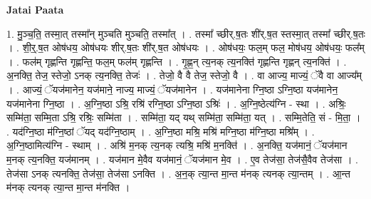 \documentclass[17pt]{extarticle}
\begin{document}
\textbf{Jatai Paata} \newline

1. मु॒ञ्च॒ति॒ तस्मा॒त् तस्मा᳚न् मुञ्चति मुञ्चति॒ तस्मा᳚त् । . तस्मा᳚ च्छीर्.ष॒तः शी॑र्.ष॒त स्तस्मा॒त् तस्मा᳚ च्छीर्.ष॒तः । . शी॒र्॒.ष॒त ओष॑धय॒ ओष॑धयः शीर्.ष॒तः शी॑र्.ष॒त ओष॑धयः । . ओष॑धयः॒ फल॒म् फल॒ मोष॑धय॒ ओष॑धयः॒ फल᳚म् । . फल॑म् गृह्णन्ति गृह्णन्ति॒ फल॒म् फल॑म् गृह्णन्ति । . गृ॒ह्ण॒न् त्य॒नक् त्य॒नक्ति॑ गृह्णन्ति गृह्णन् त्य॒नक्ति॑ । . अ॒नक्ति॒ तेज॒ स्तेजो॒ ऽनक् त्य॒नक्ति॒ तेजः॑ । . तेजो॒ वै वै तेज॒ स्तेजो॒ वै । . वा आज्य॒ माज्यं॒ ॅवै वा आज्य᳚म् । . आज्यं॒ ॅयज॑मानेन॒ यज॑माने॒ नाज्य॒ माज्यं॒ ॅयज॑मानेन । . यज॑मानेना ग्नि॒ष्ठा ऽग्नि॒ष्ठा यज॑मानेन॒ यज॑मानेना ग्नि॒ष्ठा । . अ॒ग्नि॒ष्ठा ऽश्रि॒ रश्रि॑ रग्नि॒ष्ठा ऽग्नि॒ष्ठा ऽश्रिः॑ । . अ॒ग्नि॒ष्ठेत्य॑ग्नि - स्था । . अश्रिः॒ सम्मि॑ता॒ सम्मि॒ता ऽश्रि॒ रश्रिः॒ सम्मि॑ता । . सम्मि॑ता॒ यद् यथ् सम्मि॑ता॒ सम्मि॑ता॒ यत् । . सम्मि॒तेति॒ सं - मि॒ता॒ । . यद॑ग्नि॒ष्ठा म॑ग्नि॒ष्ठां ॅयद् यद॑ग्नि॒ष्ठाम् । . अ॒ग्नि॒ष्ठा मश्रि॒ मश्रि॑ मग्नि॒ष्ठा म॑ग्नि॒ष्ठा मश्रि᳚म् । . अ॒ग्नि॒ष्ठामित्य॑ग्नि - स्थाम् । . अश्रि॑ म॒नक् त्य॒नक् त्यश्रि॒ मश्रि॑ म॒नक्ति॑ । . अ॒नक्ति॒ यज॑मानं॒ ॅयज॑मान म॒नक् त्य॒नक्ति॒ यज॑मानम् । . यज॑मान मे॒वैव यज॑मानं॒ ॅयज॑मान मे॒व । . ए॒व तेज॑सा॒ तेज॑सै॒वैव तेज॑सा । . तेज॑सा ऽनक् त्यनक्ति॒ तेज॑सा॒ तेज॑सा ऽनक्ति । . अ॒न॒क् त्या॒न्त मा॒न्त म॑नक् त्यनक् त्या॒न्तम् । . आ॒न्त म॑नक् त्यनक् त्या॒न्त मा॒न्त म॑नक्ति । \newline
\end{document}

